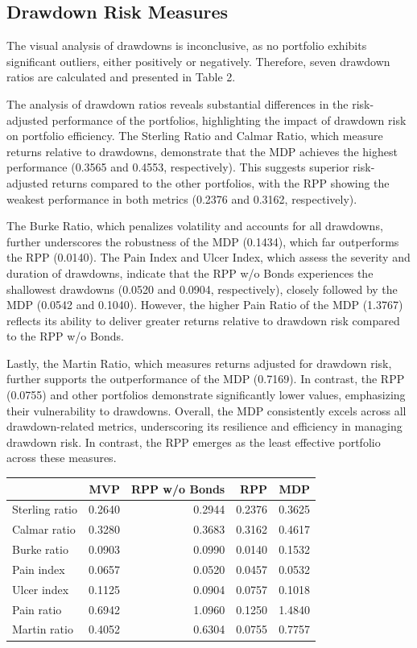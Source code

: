 \documentclass[11pt,preprint]{elsarticle}
\let\origtable\table
\let\endorigtable\endtable
\renewenvironment{table}[1][2] {
    \expandafter\origtable\expandafter[H]
} {
    \endorigtable
}
\numberwithin{equation}{section}
\numberwithin{figure}{section}
\numberwithin{table}{section}
\begin{document}
\subsection{Drawdown Risk Measures}\label{drawdown-risk-measures}

The visual analysis of drawdowns is inconclusive, as no portfolio
exhibits significant outliers, either positively or negatively.
Therefore, seven drawdown ratios are calculated and presented in Table
2.

The analysis of drawdown ratios reveals substantial differences in the
risk-adjusted performance of the portfolios, highlighting the impact of
drawdown risk on portfolio efficiency. The Sterling Ratio and Calmar
Ratio, which measure returns relative to drawdowns, demonstrate that the
MDP achieves the highest performance (0.3565 and 0.4553, respectively).
This suggests superior risk-adjusted returns compared to the other
portfolios, with the RPP showing the weakest performance in both metrics
(0.2376 and 0.3162, respectively).

The Burke Ratio, which penalizes volatility and accounts for all
drawdowns, further underscores the robustness of the MDP (0.1434), which
far outperforms the RPP (0.0140). The Pain Index and Ulcer Index, which
assess the severity and duration of drawdowns, indicate that the RPP w/o
Bonds experiences the shallowest drawdowns (0.0520 and 0.0904,
respectively), closely followed by the MDP (0.0542 and 0.1040). However,
the higher Pain Ratio of the MDP (1.3767) reflects its ability to
deliver greater returns relative to drawdown risk compared to the RPP
w/o Bonds.

Lastly, the Martin Ratio, which measures returns adjusted for drawdown
risk, further supports the outperformance of the MDP (0.7169). In
contrast, the RPP (0.0755) and other portfolios demonstrate
significantly lower values, emphasizing their vulnerability to
drawdowns. Overall, the MDP consistently excels across all
drawdown-related metrics, underscoring its resilience and efficiency in
managing drawdown risk. In contrast, the RPP emerges as the least
effective portfolio across these measures.

\begin{table}
\centering
\caption{\label{tab:drawdowns-ratio}Drawdowns ratio table}
\centering
\begin{tabular}[t]{l|r|r|r|r}
\hline
  & MVP & RPP w/o Bonds & RPP & MDP\\
\hline
Sterling ratio & 0.2640 & 0.2944 & 0.2376 & 0.3625\\
\hline
Calmar ratio & 0.3280 & 0.3683 & 0.3162 & 0.4617\\
\hline
Burke ratio & 0.0903 & 0.0990 & 0.0140 & 0.1532\\
\hline
Pain index & 0.0657 & 0.0520 & 0.0457 & 0.0532\\
\hline
Ulcer index & 0.1125 & 0.0904 & 0.0757 & 0.1018\\
\hline
Pain ratio & 0.6942 & 1.0960 & 0.1250 & 1.4840\\
\hline
Martin ratio & 0.4052 & 0.6304 & 0.0755 & 0.7757\\
\hline
\end{tabular}
\end{table}
\end{document}
